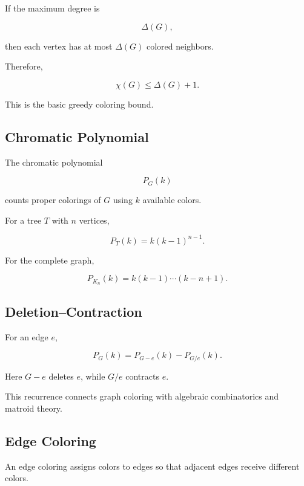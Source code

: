 If the maximum degree is

\[
\Delta(G),
\]

then each vertex has at most \(\Delta(G)\) colored neighbors.

Therefore,

\[
\boxed{
\chi(G)\leq\Delta(G)+1.
}
\]

This is the basic greedy coloring bound.

\subsection{Chromatic Polynomial}
\label{subsec:chromatic-polynomial}

The chromatic polynomial

\[
\boxed{
P_G(k)
}
\]

counts proper colorings of \(G\) using \(k\) available colors.

For a tree \(T\) with \(n\) vertices,

\[
\boxed{
P_T(k)
=
k(k-1)^{n-1}.
}
\]

For the complete graph,

\[
\boxed{
P_{K_n}(k)
=
k(k-1)\cdots(k-n+1).
}
\]

\subsection{Deletion--Contraction}
\label{subsec:graph-deletion-contraction}

For an edge \(e\),

\[
\boxed{
P_G(k)
=
P_{G-e}(k)
-
P_{G/e}(k).
}
\]

Here \(G-e\) deletes \(e\), while \(G/e\) contracts \(e\).

This recurrence connects graph coloring with algebraic combinatorics and
matroid theory.

\subsection{Edge Coloring}
\label{subsec:edge-coloring}

An edge coloring assigns colors to edges so that adjacent edges receive
different colors.


